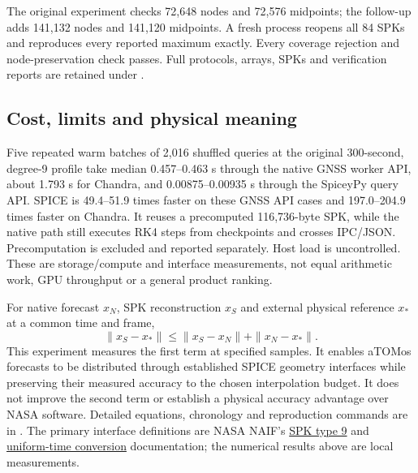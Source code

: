 The original experiment checks 72,648 nodes and 72,576 midpoints; the follow-up
adds 141,132 nodes and 141,120 midpoints. A fresh process reopens all 84 SPKs
and reproduces every reported maximum exactly. Every coverage rejection and
node-preservation check passes. Full protocols, arrays, SPKs and verification
reports are retained under .

\subsection{Cost, limits and physical meaning}
Five repeated warm batches of 2,016 shuffled queries at the original
300-second, degree-9 profile take median 0.457--0.463 s through the native
GNSS worker API, about 1.793 s for Chandra, and 0.00875--0.00935 s through the
SpiceyPy query API. SPICE is 49.4--51.9 times faster on these GNSS API cases
and 197.0--204.9 times faster on Chandra. It reuses a precomputed 116,736-byte
SPK, while the native path still executes RK4 steps from checkpoints and
crosses IPC/JSON. Precomputation is excluded and reported separately. Host load
is uncontrolled. These are storage/compute and interface measurements, not
equal arithmetic work, GPU throughput or a general product ranking.

For native forecast $x_N$, SPK reconstruction $x_S$ and external physical
reference $x_*$ at a common time and frame,
\begin{equation}
 \|x_S-x_*\|\leq\|x_S-x_N\|+\|x_N-x_*\|.
\end{equation}
This experiment measures the first term at specified samples. It enables
aTOMos forecasts to be distributed through established SPICE geometry
interfaces while preserving their measured accuracy to the chosen interpolation
budget. It does not improve the second term or establish a physical accuracy
advantage over NASA software. Detailed equations, chronology and reproduction
commands are in .
The primary interface definitions are NASA NAIF's
\href{https://naif.jpl.nasa.gov/pub/naif/toolkit_docs/C/cspice/spkw09_c.html}{SPK type 9}
and \href{https://naif.jpl.nasa.gov/pub/naif/toolkit_docs/C/cspice/unitim_c.html}{uniform-time conversion}
documentation; the numerical results above are local measurements.
